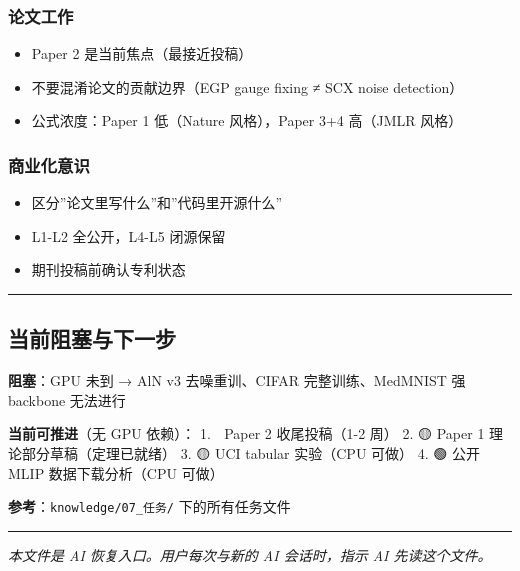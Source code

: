 \documentclass[
  12pt,
]{ctexart}
\providecommand{\tightlist}{%
  \setlength{\itemsep}{0pt}\setlength{\parskip}{0pt}}
\begin{document}
\subsubsection{论文工作}\label{ux8bbaux6587ux5de5ux4f5c}

\begin{itemize}
\tightlist
\item
  Paper 2 是当前焦点（最接近投稿）
\item
  不要混淆论文的贡献边界（EGP gauge fixing ≠ SCX noise detection）
\item
  公式浓度：Paper 1 低（Nature 风格），Paper 3+4 高（JMLR 风格）
\end{itemize}

\subsubsection{商业化意识}\label{ux5546ux4e1aux5316ux610fux8bc6}

\begin{itemize}
\tightlist
\item
  区分''论文里写什么''和''代码里开源什么''
\item
  L1-L2 全公开，L4-L5 闭源保留
\item
  期刊投稿前确认专利状态
\end{itemize}

\begin{center}\rule{0.5\linewidth}{0.5pt}\end{center}

\subsection{当前阻塞与下一步}\label{ux5f53ux524dux963bux585eux4e0eux4e0bux4e00ux6b65}

\textbf{阻塞}：GPU 未到 → AlN v3 去噪重训、CIFAR 完整训练、MedMNIST 强
backbone 无法进行

\textbf{当前可推进}（无 GPU 依赖）： 1. 🔴 Paper 2 收尾投稿（1-2 周） 2.
🟡 Paper 1 理论部分草稿（定理已就绪） 3. 🟡 UCI tabular 实验（CPU 可做）
4. 🟢 公开 MLIP 数据下载分析（CPU 可做）

\textbf{参考}：\texttt{knowledge/07\_任务/} 下的所有任务文件

\begin{center}\rule{0.5\linewidth}{0.5pt}\end{center}

\emph{本文件是 AI 恢复入口。用户每次与新的 AI 会话时，指示 AI
先读这个文件。}
\end{document}
